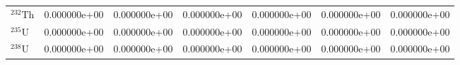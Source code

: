 \begin{tabular}{lrrrrrr}
$^{232}\mathrm{Th}$ &       0.000000e+00 &      0.000000e+00 &      0.000000e+00 &       0.000000e+00 &      0.000000e+00 &      0.000000e+00 \\
$^{235}\mathrm{U}$  &       0.000000e+00 &      0.000000e+00 &      0.000000e+00 &       0.000000e+00 &      0.000000e+00 &      0.000000e+00 \\
$^{238}\mathrm{U}$  &       0.000000e+00 &      0.000000e+00 &      0.000000e+00 &       0.000000e+00 &      0.000000e+00 &      0.000000e+00 \\
\bottomrule
\end{tabular}

